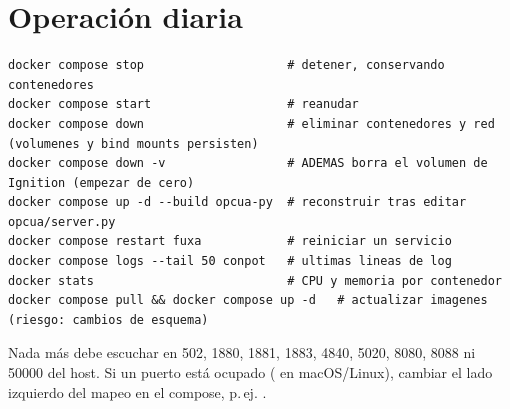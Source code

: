 \section{Operación diaria}

\begin{lstlisting}[style=bash]
docker compose stop                    # detener, conservando contenedores
docker compose start                   # reanudar
docker compose down                    # eliminar contenedores y red (volumenes y bind mounts persisten)
docker compose down -v                 # ADEMAS borra el volumen de Ignition (empezar de cero)
docker compose up -d --build opcua-py  # reconstruir tras editar opcua/server.py
docker compose restart fuxa            # reiniciar un servicio
docker compose logs --tail 50 conpot   # ultimas lineas de log
docker stats                           # CPU y memoria por contenedor
docker compose pull && docker compose up -d   # actualizar imagenes (riesgo: cambios de esquema)
\end{lstlisting}

\begin{aviso}
Nada más debe escuchar en 502, 1880, 1881, 1883, 4840, 5020, 8080, 8088 ni 50000 del host. Si un puerto está ocupado ( en macOS/Linux), cambiar el lado izquierdo del mapeo en el compose, p.\,ej. .
\end{aviso}
